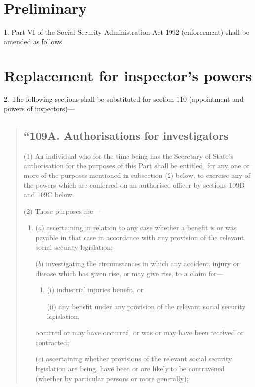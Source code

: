 \documentclass[12pt,a4paper]{article}
\begin{document}
\renewcommand\parthead{--- Schedule 6}

\section*{Preliminary}

1. Part VI of the Social Security Administration Act 1992 (enforcement) shall be amended as follows.

\section*{Replacement for inspector’s powers}

2. The following sections shall be substituted for section 110 (appointment and powers of inspectors)—
\begin{quotation}
\subsection*{“109A. Authorisations for investigators}

(1) An individual who for the time being has the Secretary of State’s authorisation for the purposes of this Part shall be entitled, for any one or more of the purposes mentioned in subsection (2)  below, to exercise any of the powers which are conferred on an authorised officer by sections 109B and 109C below.

(2) Those purposes are—
\begin{enumerate}\item[]
($a$) ascertaining in relation to any case whether a benefit is or was payable in that case in accordance with any provision of the relevant social security legislation;

($b$) investigating the circumstances in which any accident, injury or disease which has given rise, or may give rise, to a claim for—
\begin{enumerate}\item[]
(i) industrial injuries benefit, or

(ii) any benefit under any provision of the relevant social security legislation,
\end{enumerate}
occurred or may have occurred, or was or may have been received or contracted;

($c$) ascertaining whether provisions of the relevant social security legislation are being, have been or are likely to be contravened (whether by particular persons or more generally);


\end{enumerate}
\end{quotation}
\end{document}
